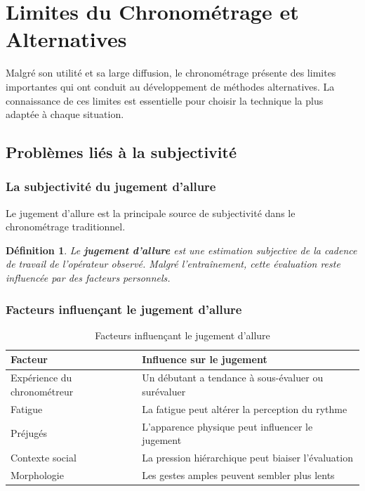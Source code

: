 \documentclass[a4paper,12pt]{article}
\newtheorem{definition}{Définition}[section]
\begin{document}

\section{Limites du Chronométrage et Alternatives}

Malgré son utilité et sa large diffusion, le chronométrage présente des limites importantes qui ont conduit au développement de méthodes alternatives. La connaissance de ces limites est essentielle pour choisir la technique la plus adaptée à chaque situation.

\subsection{Problèmes liés à la subjectivité}

\subsubsection{La subjectivité du jugement d'allure}

Le jugement d'allure est la principale source de subjectivité dans le chronométrage traditionnel.

\begin{definition}
Le \textbf{jugement d'allure} est une estimation subjective de la cadence de travail de l'opérateur observé. Malgré l'entraînement, cette évaluation reste influencée par des facteurs personnels.
\end{definition}

\subsubsection{Facteurs influençant le jugement d'allure}

\begin{table}[ht]
\centering
\begin{tabular}{|p{5cm}|p{9cm}|}
\hline
\textbf{Facteur} & \textbf{Influence sur le jugement} \\
\hline
Expérience du chronométreur & Un débutant a tendance à sous-évaluer ou surévaluer \\
Fatigue & La fatigue peut altérer la perception du rythme \\
Préjugés & L'apparence physique peut influencer le jugement \\
Contexte social & La pression hiérarchique peut biaiser l'évaluation \\
Morphologie & Les gestes amples peuvent sembler plus lents \\
\hline
\end{tabular}
\caption{Facteurs influençant le jugement d'allure}
\end{table}
\end{document}
